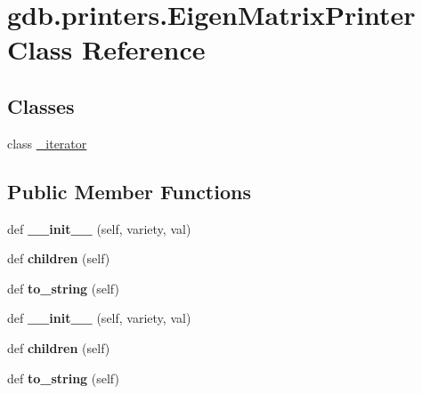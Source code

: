\hypertarget{classgdb_1_1printers_1_1_eigen_matrix_printer}{}\section{gdb.\+printers.\+Eigen\+Matrix\+Printer Class Reference}
\label{classgdb_1_1printers_1_1_eigen_matrix_printer}
\subsection*{Classes}
\begin{DoxyCompactItemize}
\item 
class \hyperlink{classgdb_1_1printers_1_1_eigen_matrix_printer_1_1__iterator}{\+\_\+iterator}
\end{DoxyCompactItemize}
\subsection*{Public Member Functions}
\begin{DoxyCompactItemize}
\item 
\mbox{\label{classgdb_1_1printers_1_1_eigen_matrix_printer_a38a1b141e7899a52175814305794fa15}} 
def {\bfseries \+\_\+\+\_\+init\+\_\+\+\_\+} (self, variety, val)
\item 
\mbox{\label{classgdb_1_1printers_1_1_eigen_matrix_printer_a717668b63ded546d6f0f0f95e654ef96}} 
def {\bfseries children} (self)
\item 
\mbox{\label{classgdb_1_1printers_1_1_eigen_matrix_printer_aeae92629f73e501703336076c413530c}} 
def {\bfseries to\+\_\+string} (self)
\item 
\mbox{\label{classgdb_1_1printers_1_1_eigen_matrix_printer_a38a1b141e7899a52175814305794fa15}} 
def {\bfseries \+\_\+\+\_\+init\+\_\+\+\_\+} (self, variety, val)
\item 
\mbox{\label{classgdb_1_1printers_1_1_eigen_matrix_printer_a717668b63ded546d6f0f0f95e654ef96}} 
def {\bfseries children} (self)
\item 
\mbox{\label{classgdb_1_1printers_1_1_eigen_matrix_printer_aeae92629f73e501703336076c413530c}} 
def {\bfseries to\+\_\+string} (self)
\end{DoxyCompactItemize}
